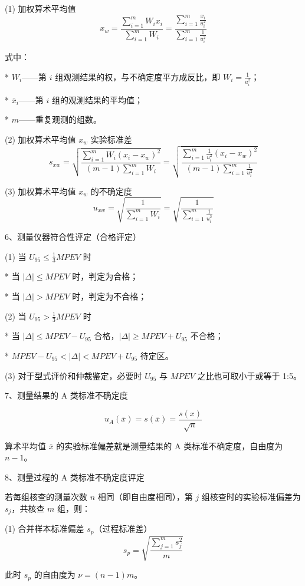 \documentclass[UTF8]{ctexart}
\begin{document}
(1) 加权算术平均值
\[
x_w = \frac{\sum_{i=1}^{m} W_i x_i}{\sum_{i=1}^{m} W_i} = \frac{\sum_{i=1}^{m} \frac{x_i}{u_i^2}}{\sum_{i=1}^{m} \frac{1}{u_i^2}}
\]

式中：

*   \(W_i\)——第 \(i\) 组观测结果的权，与不确定度平方成反比，即 \(W_i = \frac{1}{u_i^2}\)；

*   \(\bar{x}_i\)——第 \(i\) 组的观测结果的平均值；

*   \(m\)——重复观测的组数。

(2) 加权算术平均值 \(x_w\) 实验标准差
\[
s_{xw} = \sqrt{\frac{\sum_{i=1}^{m} W_i (x_i - x_w)^2}{(m-1) \sum_{i=1}^{m} W_i}} = \sqrt{\frac{\sum_{i=1}^{m} \frac{1}{u_i^2} (x_i - x_w)^2}{(m-1) \sum_{i=1}^{m} \frac{1}{u_i^2}}}
\]

(3) 加权算术平均值 \(x_w\) 的不确定度
\[
u_{xw} = \sqrt{\frac{1}{\sum_{i=1}^{m} W_i}} = \sqrt{\frac{1}{\sum_{i=1}^{m} \frac{1}{u_i^2}}}
\]

\vspace{5mm} 
6、测量仪器符合性评定（合格评定）

(1) 当 \(U_{95} \le \frac{1}{3} MPEV\) 时

*   当 \(|\Delta| \le MPEV\) 时，判定为合格；

*   当 \(|\Delta| > MPEV\) 时，判定为不合格；

(2) 当 \(U_{95} > \frac{1}{3} MPEV\) 时

*   当 \(|\Delta| \le MPEV - U_{95}\) 合格，\(|\Delta| \ge MPEV + U_{95}\) 不合格；

*   \(MPEV - U_{95} < |\Delta| < MPEV + U_{95}\) 待定区。

(3) 对于型式评价和仲裁鉴定，必要时 \(U_{95}\) 与 \(MPEV\) 之比也可取小于或等于 1:5。

\vspace{5mm} 
7、测量结果的 A 类标准不确定度

\[
u_A(\bar{x}) = s(\bar{x}) = \frac{s(x)}{\sqrt{n}}
\]

算术平均值 \(\bar{x}\) 的实验标准偏差就是测量结果的 A 类标准不确定度，自由度为 \(n-1\)。

\vspace{5mm} 
8、测量过程的 A 类标准不确定度评定

若每组核查的测量次数 \(n\) 相同（即自由度相同），第 \(j\) 组核查时的实验标准偏差为 \(s_j\)，共核查 \(m\) 组，则：

(1) 合并样本标准偏差 \(s_p\)（过程标准差）
\[
s_p = \sqrt{\frac{\sum_{j=1}^{m} s_j^2}{m}}
\]

此时 \(s_p\) 的自由度为 \(\nu = (n-1)m\)。
\end{document}
